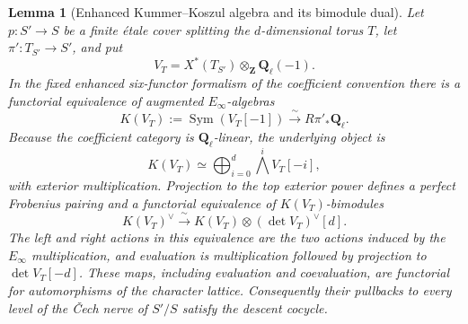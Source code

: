 \documentclass[11pt]{article}
\newtheorem{lemma}[theorem]{Lemma}
\theoremstyle{definition}
\theoremstyle{remark}
\newcommand{\Qell}{\mathbf Q_\ell}
\begin{document}
\begin{lemma}[Enhanced Kummer--Koszul algebra and its bimodule dual]
\label{lem:enhanced-torus-Koszul}
Let $p:S'\to S$ be a finite \'etale cover splitting the $d$-dimensional torus
$T$, let $\pi':T_{S'}\to S'$, and put
\[
 V_T=X^*(T_{S'})\otimes_{\mathbf Z}\Qell(-1).
\]
In the fixed enhanced six-functor formalism of the coefficient convention
there is
a functorial equivalence of augmented $E_\infty$-algebras
\begin{equation}
 K(V_T):=\operatorname{Sym}(V_T[-1])
 \xrightarrow{\ \sim\ }R\pi'_*\Qell.
 \label{eq:enhanced-torus-Koszul-algebra}
\end{equation}
Because the coefficient category is $\Qell$-linear, the underlying object is
\begin{equation}
 K(V_T)\simeq
 \bigoplus_{i=0}^d\bigwedge^iV_T[-i],
 \label{eq:enhanced-torus-exterior-object}
\end{equation}
with exterior multiplication.  Projection to the top exterior power defines
a perfect Frobenius pairing and a functorial equivalence of
$K(V_T)$-bimodules
\begin{equation}
 K(V_T)^\vee
 \xrightarrow{\ \sim\ }
 K(V_T)\otimes(\det V_T)^\vee[d].
 \label{eq:enhanced-torus-Koszul-bimodule-dual}
\end{equation}
The left and right actions in this equivalence are the two actions induced by
the $E_\infty$ multiplication, and evaluation is multiplication followed by
projection to $\det V_T[-d]$.  These maps, including evaluation and
coevaluation, are functorial for automorphisms of the character lattice.
Consequently their pullbacks to every level of the \v{C}ech nerve of $S'/S$
satisfy the descent cocycle.
\end{lemma}
\end{document}
